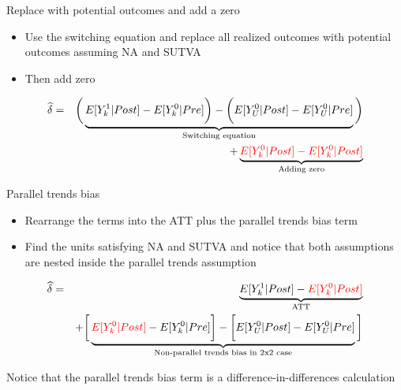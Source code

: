 \documentclass{beamer}
\begin{document}
\begin{frame}{Replace with potential outcomes and add a zero}

\begin{itemize}
\item Use the switching equation and replace all realized outcomes with potential outcomes assuming NA and SUTVA
\item Then add zero
\end{itemize}

\begin{eqnarray*}
\widehat{\delta} &=& \bigg ( \underbrace{E[Y^1_k|Post] - E[Y^0_k|Pre] \bigg ) - \bigg ( E[Y^0_U | Post ] - E[ Y^0_U | Pre]}_{\mathclap{\text{Switching equation}}} \bigg)  \\
&&+ \underbrace{\textcolor{red}{E[Y_k^0 |Post] - E[Y^0_k | Post]}}_{\mathclap{\text{Adding zero}}} 
\end{eqnarray*}

\end{frame}

\begin{frame}{Parallel trends bias}

\begin{itemize}
\item Rearrange the terms into the ATT plus the parallel trends bias term
\item Find the units satisfying NA and SUTVA and notice that both assumptions are nested inside the parallel trends assumption
\end{itemize}

\begin{eqnarray*}
\widehat{\delta} &=& \underbrace{E[Y^1_k | Post] - \textcolor{red}{E[Y^0_k | Post]}}_{\mathclap{\text{ATT}}} \\
&& + \bigg [  \underbrace{\textcolor{red}{E[Y^0_k | Post]} - E[Y^0_k | Pre] \bigg ] - \bigg [ E[Y^0_U | Post] - E[Y_U^0 | Pre] }_{\mathclap{\text{Non-parallel trends bias in 2x2 case}}} \bigg ]
\end{eqnarray*}

Notice that the parallel trends bias term is a difference-in-differences calculation


\end{frame}
\end{document}
